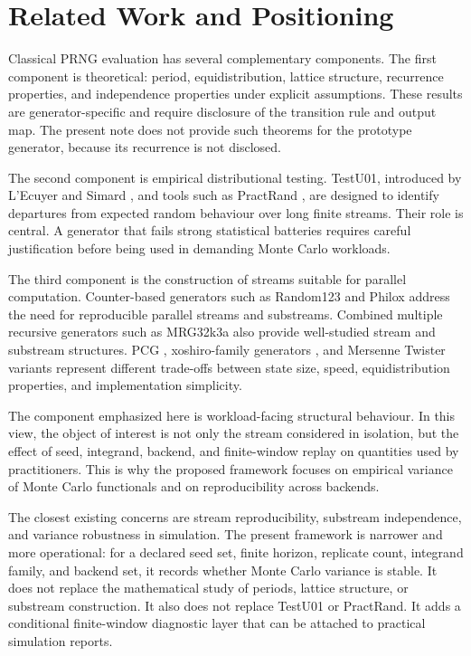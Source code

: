 \documentclass[11pt,a4paper]{article}
\begin{document}
\section{Related Work and Positioning}

Classical PRNG evaluation has several complementary components. The first component is theoretical: period, equidistribution, lattice structure, recurrence properties, and independence properties under explicit assumptions. These results are generator-specific and require disclosure of the transition rule and output map. The present note does not provide such theorems for the prototype generator, because its recurrence is not disclosed.

The second component is empirical distributional testing. TestU01, introduced by L'Ecuyer and Simard \cite{lecuyer2007testu01}, and tools such as PractRand \cite{practrand}, are designed to identify departures from expected random behaviour over long finite streams. Their role is central. A generator that fails strong statistical batteries requires careful justification before being used in demanding Monte Carlo workloads.

The third component is the construction of streams suitable for parallel computation. Counter-based generators such as Random123 and Philox \cite{salmon2011parallel} address the need for reproducible parallel streams and substreams. Combined multiple recursive generators such as MRG32k3a \cite{lecuyer1999mrg} also provide well-studied stream and substream structures. PCG \cite{oneill2014pcg}, xoshiro-family generators \cite{vigna2017scramblings}, and Mersenne Twister variants \cite{matsumoto1998mersenne} represent different trade-offs between state size, speed, equidistribution properties, and implementation simplicity.

The component emphasized here is workload-facing structural behaviour. In this view, the object of interest is not only the stream considered in isolation, but the effect of seed, integrand, backend, and finite-window replay on quantities used by practitioners. This is why the proposed framework focuses on empirical variance of Monte Carlo functionals and on reproducibility across backends.

The closest existing concerns are stream reproducibility, substream independence, and variance robustness in simulation. The present framework is narrower and more operational: for a declared seed set, finite horizon, replicate count, integrand family, and backend set, it records whether Monte Carlo variance is stable. It does not replace the mathematical study of periods, lattice structure, or substream construction. It also does not replace TestU01 or PractRand. It adds a conditional finite-window diagnostic layer that can be attached to practical simulation reports.
\end{document}
